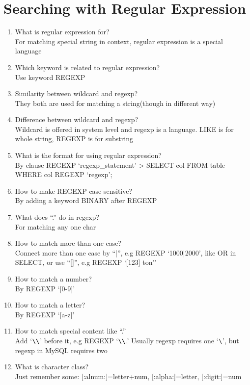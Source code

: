 \documentclass[10pt,a4paper,oneside]{article}
\begin{document}
\section{Searching with Regular Expression}
\begin{enumerate}[1.]
\item  What is regular expression for?  \\
For matching special string in context, regular expression is a special language
\item Which keyword is related to regular expression?   \\
Use keyword REGEXP
\item  Similarity between wildcard and regexp?  \\
They both are used for matching a string(though in different way)
\item   Difference between wildcard and regexp? \\
Wildcard is offered in system level and regexp is a language. LIKE is for whole string, REGEXP is for substring
\item  What is the format for using regular expression?  \\
By clause REGEXP `regexp\_statement' > SELECT col FROM table WHERE col REGEXP `regexp';
\item   How to make REGEXP case-sensitive? \\
By adding a keyword BINARY after REGEXP
\item  What does ``.'' do in regexp?  \\
For matching any one char
\item  How to match more than one case?  \\
Connect more than one case by ``|'', e.g REGEXP `1000|2000', like OR in SELECT, or use ``[]'', e.g REGEXP `[123] ton''
\item   How to match a number? \\
By REGEXP `[0-9]'
\item   How to match a letter? \\
By REGEXP `[a-z]'
\item  How to match special content like ``.''  \\
Add `$ \verb|\\|$' before it, e.g REGEXP `$ \verb|\\|$.' Usually regexp requires one `$ \verb|\|$', but regexp in MySQL requires two
\item What is character class?   \\
Just remember some: [:alnum:]=letter+num, [:alpha:]=letter, [:digit:]=num

\end{enumerate}
\end{document}

